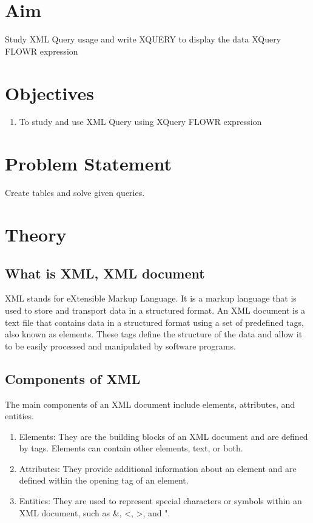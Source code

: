 \documentclass[11pt]{article}
\begin{document}
\tableofcontents
\thispagestyle{empty}
\clearpage

\setcounter{page}{1}

\section{Aim}
Study XML Query usage and write XQUERY to display the data XQuery FLOWR expression

\section{Objectives}
\begin{enumerate}
    \item To study and use XML Query using XQuery FLOWR expression
\end{enumerate}

\section{Problem Statement}
Create tables and solve given queries.

\section{Theory}
\subsection{What is XML, XML document}
XML stands for eXtensible Markup Language. It is a markup language that is used to store and transport data in a structured format. An XML document is a text file that contains data in a structured format using a set of predefined tags, also known as elements. These tags define the structure of the data and allow it to be easily processed and manipulated by software programs.

\subsection{Components of XML}
The main components of an XML document include elements, attributes, and entities.

\begin{enumerate}
    \item Elements: They are the building blocks of an XML document and are defined by tags. Elements can contain other elements, text, or both.
    \item Attributes: They provide additional information about an element and are defined within the opening tag of an element.
    \item Entities: They are used to represent special characters or symbols within an XML document, such as \&, <, >, and ".
\end{enumerate}
\end{document}
